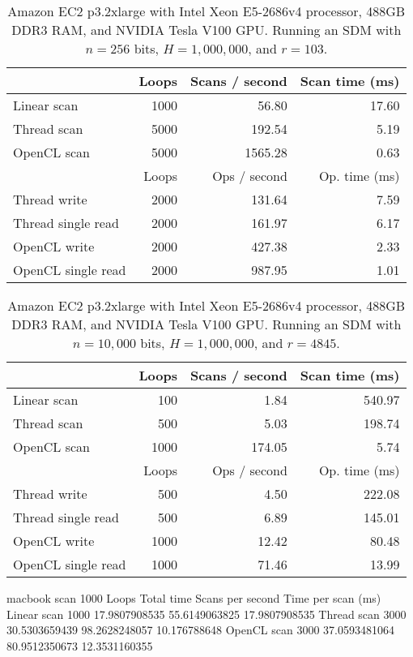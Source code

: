 \begin{table}[!htb]
\centering
\begin{tabular}{| l | r | r | r |}
    \hline
    & Loops & Scans / second & Scan time (ms) \\ \hline
    Linear scan & 1000 & 56.80 & 17.60 \\
    Thread scan & 5000 & 192.54 & 5.19 \\
    OpenCL scan & 5000 & 1565.28 & 0.63 \\ \hline
    \hline
    & Loops & Ops / second & Op. time (ms) \\ \hline
    Thread write & 2000 & 131.64 & 7.59 \\
    Thread single read & 2000 & 161.97 & 6.17 \\
    OpenCL write & 2000 & 427.38 & 2.33 \\
    OpenCL single read & 2000 & 987.95 & 1.01 \\
    \hline
\end{tabular}
\caption{Amazon EC2 p3.2xlarge with Intel Xeon E5-2686v4 processor, 488GB DDR3 RAM, and NVIDIA Tesla V100 GPU. Running an SDM with $n=256$ bits, $H=1,000,000$, and $r=103$.}
\end{table}

\begin{table}[!htb]
\centering
\begin{tabular}{| l | r | r | r |}
    \hline
    & Loops & Scans / second & Scan time (ms) \\ \hline
    Linear scan & 100 & 1.84 & 540.97 \\
    Thread scan & 500 & 5.03 & 198.74 \\
    OpenCL scan & 1000 & 174.05 & 5.74 \\ \hline
    \hline
    & Loops & Ops / second & Op. time (ms) \\ \hline
    Thread write & 500 & 4.50 & 222.08 \\
    Thread single read & 500 & 6.89 & 145.01 \\
    OpenCL write & 1000 & 12.42 & 80.48 \\
    OpenCL single read & 1000 & 71.46 & 13.99 \\
    \hline
\end{tabular}
\caption{Amazon EC2 p3.2xlarge with Intel Xeon E5-2686v4 processor, 488GB DDR3 RAM, and NVIDIA Tesla V100 GPU. Running an SDM with $n=10,000$ bits, $H=1,000,000$, and $r=4845$.}
\end{table}


macbook scan 1000
	Loops	Total time	Scans per second	Time per scan (ms)
Linear scan	1000	17.9807908535	55.6149063825	17.9807908535
Thread scan	3000	30.5303659439	98.2628248057	10.176788648
OpenCL scan	3000	37.0593481064	80.9512350673	12.3531160355

